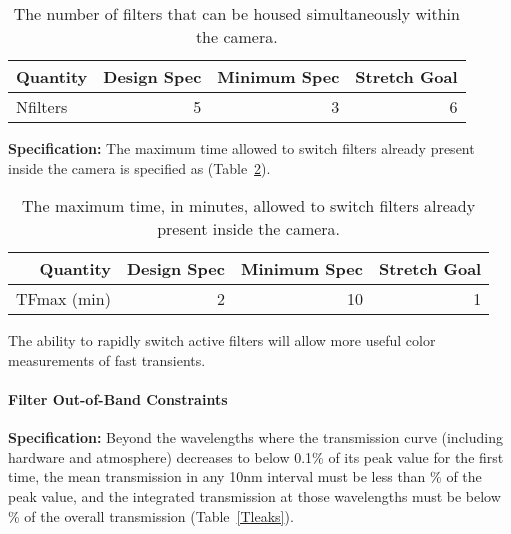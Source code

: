 \begin{table}[bh!]
\begin{tabular}{|l|r|r|r|}
\hline
Quantity        & Design Spec & Minimum Spec & Stretch Goal      \\
\hline
 Nfilters       &      5      &      3       &       6           \\
\hline
\end{tabular}
\caption{The number of filters that can be housed simultaneously within the
camera. }
\label{Tfilterchanges}
\end{table}


\newpage
{\bf Specification:} The maximum time allowed to switch filters already
present inside the camera is specified as
(Table~\ref{Tfilterswitch}).

\begin{table}[h]
\begin{tabular}{|r|r|r|r|}
\hline
     Quantity     & Design Spec & Minimum Spec  & Stretch Goal      \\
\hline
 TFmax (min)      &      2      &      10       &       1           \\
\hline
\end{tabular}
\caption{The maximum time, in minutes, allowed to switch filters already
present inside the camera.}
\label{Tfilterswitch}
\end{table}

The ability to rapidly switch active filters will allow more useful color
measurements of fast transients. 


\paragraph{Filter Out-of-Band Constraints\\}

{\bf Specification:} Beyond the wavelengths where the transmission curve
(including hardware and atmosphere) decreases to below 0.1\% of its peak value
for the first time, the mean transmission in any 10nm interval must be less than
\% of the peak value, and the integrated transmission at those wavelengths
must be below
\% of the overall transmission (Table~\ref{Tleaks}).


